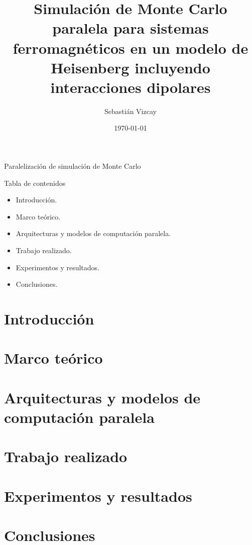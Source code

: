 \documentclass[xcolor=table]{beamer}
\author{Sebastián Vizcay}
\title{Simulación de Monte Carlo paralela para sistemas ferromagnéticos en un modelo de Heisenberg incluyendo interacciones dipolares}
\date{\today}
\begin{document}
\begin{frame}

\titlepage
\end{frame}

\begin{frame}{Paralelización de simulación de Monte Carlo}
\begin{block}{Tabla de contenidos}
\begin{itemize}
  \item Introducción.
  \item Marco teórico.
  \item Arquitecturas y modelos de computación paralela.
  \item Trabajo realizado.
  \item Experimentos y resultados.
  \item Conclusiones.
\end{itemize}
\end{block}
\end{frame}

\section{Introducción}


\section{Marco teórico}


\section{Arquitecturas y modelos de computación paralela}


\section{Trabajo realizado}


\section{Experimentos y resultados}


\section{Conclusiones}


\section{}

\end{document}
